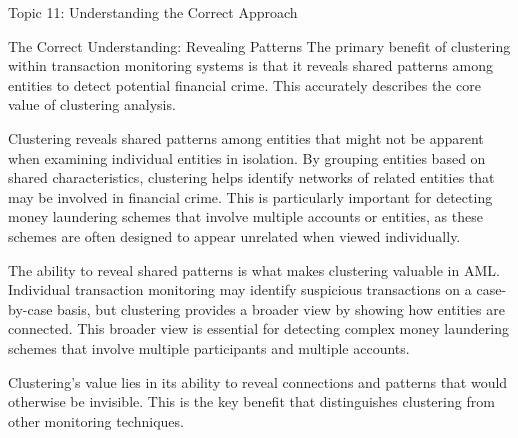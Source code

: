 \documentclass[5pt]{beamer}
\begin{document}
	\begin{frame}{Topic 11: Understanding the Correct Approach}
		\begin{block}{\tiny The Correct Understanding: Revealing Patterns}
			\tiny The primary benefit of clustering within transaction monitoring systems is that it reveals shared patterns among entities to detect potential financial crime. This accurately describes the core value of clustering analysis.
			
			Clustering reveals shared patterns among entities that might not be apparent when examining individual entities in isolation. By grouping entities based on shared characteristics, clustering helps identify networks of related entities that may be involved in financial crime. This is particularly important for detecting money laundering schemes that involve multiple accounts or entities, as these schemes are often designed to appear unrelated when viewed individually.
			
			The ability to reveal shared patterns is what makes clustering valuable in AML. Individual transaction monitoring may identify suspicious transactions on a case-by-case basis, but clustering provides a broader view by showing how entities are connected. This broader view is essential for detecting complex money laundering schemes that involve multiple participants and multiple accounts.
			
			Clustering's value lies in its ability to reveal connections and patterns that would otherwise be invisible. This is the key benefit that distinguishes clustering from other monitoring techniques.
		\end{block}
	\end{frame}
	
\end{document}
